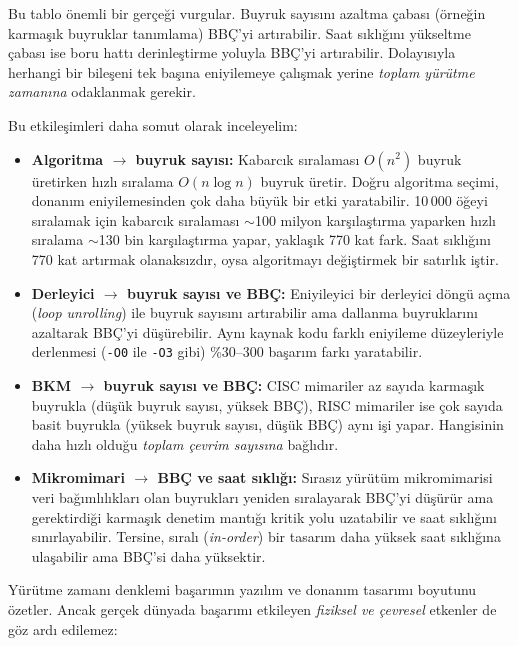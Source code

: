 \noindent Bu tablo önemli bir gerçeği vurgular. Buyruk sayısını azaltma çabası (örneğin karmaşık buyruklar tanımlama) BBÇ'yi artırabilir. Saat sıklığını yükseltme çabası ise boru hattı derinleştirme yoluyla BBÇ'yi artırabilir. Dolayısıyla herhangi bir bileşeni tek başına eniyilemeye çalışmak yerine \emph{toplam yürütme zamanına} odaklanmak gerekir.

Bu etkileşimleri daha somut olarak inceleyelim:
\begin{itemize}
    \item \textbf{Algoritma $\rightarrow$ buyruk sayısı:} Kabarcık sıralaması $O(n^2)$ buyruk üretirken hızlı sıralama $O(n \log n)$ buyruk üretir. Doğru algoritma seçimi, donanım eniyilemesinden çok daha büyük bir etki yaratabilir. 10\,000 öğeyi sıralamak için kabarcık sıralaması $\sim$100 milyon karşılaştırma yaparken hızlı sıralama $\sim$130 bin karşılaştırma yapar, yaklaşık 770 kat fark. Saat sıklığını 770 kat artırmak olanaksızdır, oysa algoritmayı değiştirmek bir satırlık iştir.

    \item \textbf{Derleyici $\rightarrow$ buyruk sayısı ve BBÇ:} Eniyileyici bir derleyici döngü açma (\emph{loop unrolling}) ile buyruk sayısını artırabilir ama dallanma buyruklarını azaltarak BBÇ'yi düşürebilir. Aynı kaynak kodu farklı eniyileme düzeyleriyle derlenmesi (\texttt{-O0} ile \texttt{-O3} gibi) \%30--300 başarım farkı yaratabilir.

    \item \textbf{BKM $\rightarrow$ buyruk sayısı ve BBÇ:} CISC mimariler az sayıda karmaşık buyrukla (düşük buyruk sayısı, yüksek BBÇ), RISC mimariler ise çok sayıda basit buyrukla (yüksek buyruk sayısı, düşük BBÇ) aynı işi yapar. Hangisinin daha hızlı olduğu \emph{toplam çevrim sayısına} bağlıdır.

    \item \textbf{Mikromimari $\rightarrow$ BBÇ ve saat sıklığı:} Sırasız yürütüm mikromimarisi veri bağımlılıkları olan buyrukları yeniden sıralayarak BBÇ'yi düşürür ama gerektirdiği karmaşık denetim mantığı kritik yolu uzatabilir ve saat sıklığını sınırlayabilir. Tersine, sıralı (\emph{in-order}) bir tasarım daha yüksek saat sıklığına ulaşabilir ama BBÇ'si daha yüksektir.
\end{itemize}

Yürütme zamanı denklemi başarımın yazılım ve donanım tasarımı boyutunu özetler. Ancak gerçek dünyada başarımı etkileyen \emph{fiziksel ve çevresel} etkenler de göz ardı edilemez:

